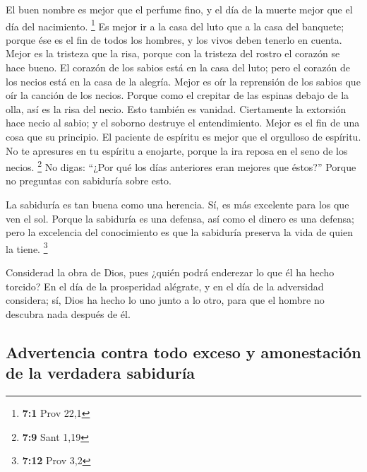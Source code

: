  El buen nombre es mejor que el perfume fino, y el día de
la muerte mejor que el día del nacimiento. \footnote{\textbf{7:1} Prov
  22,1}  Es mejor ir a la casa del luto que a la casa del
banquete; porque ése es el fin de todos los hombres, y los vivos deben
tenerlo en cuenta.  Mejor es la tristeza que la risa,
porque con la tristeza del rostro el corazón se hace bueno.
 El corazón de los sabios está en la casa del luto; pero
el corazón de los necios está en la casa de la alegría. 
Mejor es oír la reprensión de los sabios que oír la canción de los
necios.  Porque como el crepitar de las espinas debajo de
la olla, así es la risa del necio. Esto también es vanidad.
 Ciertamente la extorsión hace necio al sabio; y el
soborno destruye el entendimiento.  Mejor es el fin de una
cosa que su principio. El paciente de espíritu es mejor que el orgulloso
de espíritu.  No te apresures en tu espíritu a enojarte,
porque la ira reposa en el seno de los necios. \footnote{\textbf{7:9}
  Sant 1,19}  No digas: ``¿Por qué los días anteriores
eran mejores que éstos?'' Porque no preguntas con sabiduría sobre esto.

 La sabiduría es tan buena como una herencia. Sí, es más
excelente para los que ven el sol.  Porque la sabiduría
es una defensa, así como el dinero es una defensa; pero la excelencia
del conocimiento es que la sabiduría preserva la vida de quien la tiene.
\footnote{\textbf{7:12} Prov 3,2}

 Considerad la obra de Dios, pues ¿quién podrá enderezar
lo que él ha hecho torcido?  En el día de la prosperidad
alégrate, y en el día de la adversidad considera; sí, Dios ha hecho lo
uno junto a lo otro, para que el hombre no descubra nada después de él.

\hypertarget{advertencia-contra-todo-exceso-y-amonestaciuxf3n-de-la-verdadera-sabiduruxeda}{%
\subsection{Advertencia contra todo exceso y amonestación de la
verdadera
sabiduría}\label{advertencia-contra-todo-exceso-y-amonestaciuxf3n-de-la-verdadera-sabiduruxeda}}

